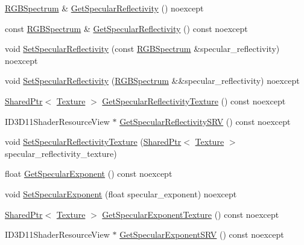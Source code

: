 \begin{DoxyCompactItemize}
\item 
\hyperlink{structmage_1_1_r_g_b_spectrum}{R\+G\+B\+Spectrum} \& \hyperlink{structmage_1_1_material_ad5fde8d972471fc99b72a4fc969883b1}{Get\+Specular\+Reflectivity} () noexcept
\item 
const \hyperlink{structmage_1_1_r_g_b_spectrum}{R\+G\+B\+Spectrum} \& \hyperlink{structmage_1_1_material_a81005b5094b99b9a8d7f16bedd195718}{Get\+Specular\+Reflectivity} () const noexcept
\item 
void \hyperlink{structmage_1_1_material_ac615e33c8e17149345488fed5c16dc7b}{Set\+Specular\+Reflectivity} (const \hyperlink{structmage_1_1_r_g_b_spectrum}{R\+G\+B\+Spectrum} \&specular\+\_\+reflectivity) noexcept
\item 
void \hyperlink{structmage_1_1_material_ade7fe7386618bd139e9c43699eba0a20}{Set\+Specular\+Reflectivity} (\hyperlink{structmage_1_1_r_g_b_spectrum}{R\+G\+B\+Spectrum} \&\&specular\+\_\+reflectivity) noexcept
\item 
\hyperlink{namespacemage_a1e01ae66713838a7a67d30e44c67703e}{Shared\+Ptr}$<$ \hyperlink{classmage_1_1_texture}{Texture} $>$ \hyperlink{structmage_1_1_material_a7ed5469af2440a4fc1db498c24f06764}{Get\+Specular\+Reflectivity\+Texture} () const noexcept
\item 
I\+D3\+D11\+Shader\+Resource\+View $\ast$ \hyperlink{structmage_1_1_material_a04fad2f985ed5078a8217ebcfd51c3f0}{Get\+Specular\+Reflectivity\+S\+RV} () const noexcept
\item 
void \hyperlink{structmage_1_1_material_a130430244dfd0b5866b00fca523e874c}{Set\+Specular\+Reflectivity\+Texture} (\hyperlink{namespacemage_a1e01ae66713838a7a67d30e44c67703e}{Shared\+Ptr}$<$ \hyperlink{classmage_1_1_texture}{Texture} $>$ specular\+\_\+reflectivity\+\_\+texture)
\item 
float \hyperlink{structmage_1_1_material_a48afb440024e4e2e45a81ce2b46c0d73}{Get\+Specular\+Exponent} () const noexcept
\item 
void \hyperlink{structmage_1_1_material_a078a2c9388993523e29f287e20385b3f}{Set\+Specular\+Exponent} (float specular\+\_\+exponent) noexcept
\item 
\hyperlink{namespacemage_a1e01ae66713838a7a67d30e44c67703e}{Shared\+Ptr}$<$ \hyperlink{classmage_1_1_texture}{Texture} $>$ \hyperlink{structmage_1_1_material_a24c476c257c3ba042ddda666c26660c0}{Get\+Specular\+Exponent\+Texture} () const noexcept
\item 
I\+D3\+D11\+Shader\+Resource\+View $\ast$ \hyperlink{structmage_1_1_material_aca8740404b0e52c781dd1c02ec167539}{Get\+Specular\+Exponent\+S\+RV} () const noexcept

\end{DoxyCompactItemize}
